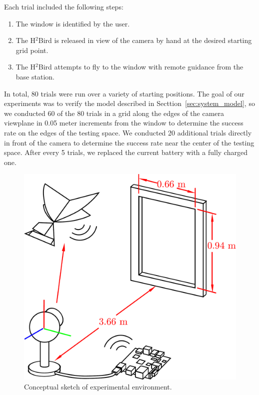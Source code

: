 \documentclass{aamas2013}
\begin{document}
Each trial included the following steps:
\begin{enumerate}
\item The window is identified by the user. 
\item The H$^2$Bird is released in view of the camera by hand at the desired starting grid point.
\item The H$^2$Bird attempts to fly to the window with remote guidance from
the base station.
\end{enumerate}

In total, 80 trials were run over a variety of starting positions. The goal of
our experiments was to verify the model described in
Secttion~\ref{sec:system_model}, so we conducted 60 of the 80 trials in a grid
along the edges of the camera viewplane in 0.05 meter increments from the
window to determine the success rate on the edges of the testing space. We
conducted 20 additional trials directly in front of the camera to determine
the success rate near the center of the testing space. After every 5 trials,
we replaced the current battery with a fully charged one.

\begin{figure}[tb]
\centering
\includegraphics[width=\linewidth]{figures/experiment_cartoon.pdf}
\caption{Conceptual sketch of experimental environment.}
\label{fig:experiment_cartoon}
\end{figure}
\end{document}
